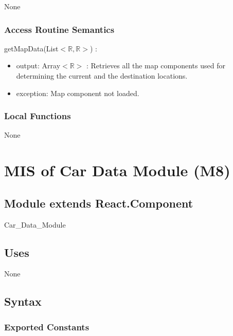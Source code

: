 \documentclass[12pt, titlepage]{article}
\begin{document}
None

\subsubsection{Access Routine Semantics}

\noindent getMapData(List$<\mathbb{R},\mathbb{R}>$) :
\begin{itemize}
\item output: Array$<\mathbb{R}>$ : Retrieves all the map components used for determining the current and the destination locations.
\item exception: Map component not loaded.
\end{itemize}

\subsubsection{Local Functions}

None

\newpage



\section{MIS of Car Data Module (M8)} 

\label{Module} 

\subsection{Module extends React.Component}

Car\_Data\_Module

\subsection{Uses}

None

\subsection{Syntax}

\subsubsection{Exported Constants}
\end{document}
